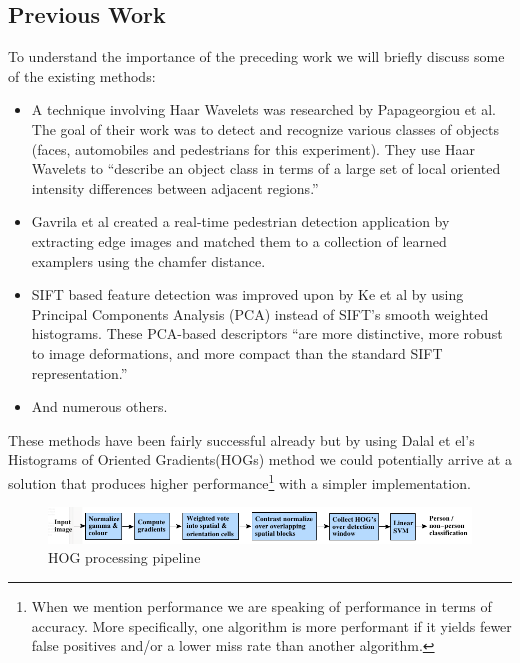 \documentclass[a4paper,11pt]{article}
\begin{document}
\begin{multicols}{2}
\section{Previous Work}
To understand the importance of the preceding work we will briefly discuss some of the existing methods:
\begin{itemize}
  \item A technique involving Haar Wavelets was researched by Papageorgiou et al\cite{Papa00}. 
    The goal of their work was to detect and recognize various classes of objects (faces, automobiles and 
    pedestrians for this experiment). They use Haar Wavelets to “describe an object class in terms of a 
    large set of local oriented intensity differences between adjacent regions.”
  \item Gavrila et al\cite{Gavri04} created a real-time pedestrian detection application by extracting edge images and 
    matched them to a collection of learned examplers using the chamfer distance.
  \item SIFT based feature detection was improved upon by Ke et al\cite{Ke04} by using Principal Components Analysis 
    (PCA) instead of SIFT’s smooth weighted histograms. These PCA-based descriptors “are more distinctive, 
    more robust to image deformations, and more compact than the standard SIFT representation.”
  \item And numerous others.
\end{itemize}
These methods have been fairly successful already but by using Dalal et el's Histograms of Oriented Gradients(HOGs) method
we could potentially arrive at a solution that produces higher performance\footnote
{When we mention performance we are speaking of performance in terms of accuracy. More specifically, one algorithm 
is more performant if it yields fewer false positives and/or a lower miss rate than another algorithm.} 
with a simpler implementation.

\end{multicols}
\begin{figure}[t]
  \includegraphics[scale=0.75]{processing_chain.png}
  \caption{HOG processing pipeline}
  \label{HOG_processing_pipeline}
\end{figure}
\end{document}
